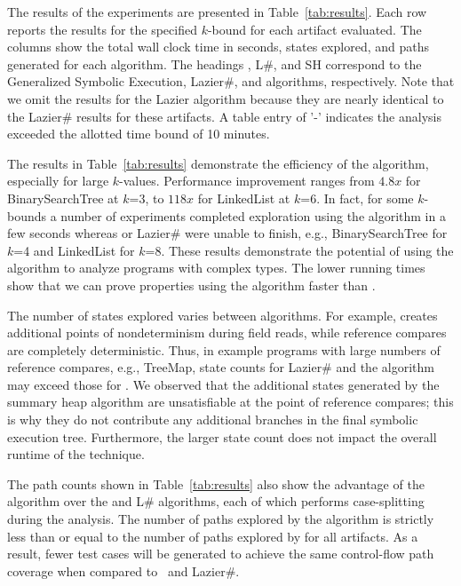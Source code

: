 The results of the experiments are presented in Table~\ref{tab:results}. 
Each row reports the results for the specified $k$-bound 
for each artifact evaluated. The columns show the total
wall clock time in seconds, states explored, and paths generated for
each algorithm. The headings \gsetxt{}, L\#, and SH correspond
to the Generalized Symbolic Execution, Lazier\#, and \symtxt{}
algorithms, respectively. Note that we omit the results for
the Lazier algorithm because they are nearly identical to the Lazier\#
results for these artifacts. A table entry of  '-' indicates the analysis
exceeded the allotted time bound of 10 minutes.

The results in Table~\ref{tab:results} demonstrate the efficiency of the 
\symtxt{} algorithm, especially for
large $k$-values. Performance improvement ranges from $4.8x$ for
BinarySearchTree at $k$=3, to $118x$ for LinkedList at $k$=6. In fact,
for some $k$-bounds a number of experiments completed exploration
using the \symtxt{} algorithm in a few seconds whereas \gsetxt{} or Lazier\# were
unable to finish, e.g., BinarySearchTree for $k$=4 and LinkedList for
$k$=8. These results demonstrate the potential of using the \symtxt{} algorithm 
to analyze programs with complex types. The lower running times
show that we can prove properties using the \symtxt{} algorithm 
faster than \gsetxt{}.

The number of states explored varies between algorithms. For example,
\gsetxt{} creates additional points of nondeterminism during field reads, 
while reference compares are completely deterministic. Thus, in
example programs with large numbers of reference compares, e.g.,
TreeMap, state counts for Lazier\# and the \symtxt{} algorithm may
exceed those for \gsetxt{}. We observed that the additional states
generated by the summary heap algorithm are unsatisfiable at the point
of reference compares; this is why they do not contribute any
additional branches in the final symbolic execution tree. Furthermore,
the larger state count does not impact the overall runtime of the
technique.


The path counts shown in Table~\ref{tab:results} also show the advantage
of the \symtxt{} algorithm over the \gsetxt{} and L\# algorithms, each of
which performs case-splitting during the analysis.
The number of paths explored by the \symtxt{} algorithm is strictly 
less than or equal to the number
of paths explored by \gsetxt{} for all artifacts. As a result,
fewer test cases will be generated to achieve the same control-flow 
path coverage when compared to~\gsetxt{} and Lazier\#.

